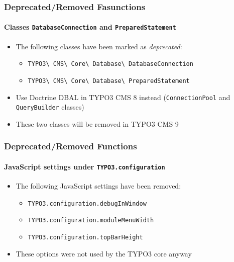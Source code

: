 \begin{frame}[fragile]
	\frametitle{Deprecated/Removed Fasunctions}
	\framesubtitle{Classes \texttt{DatabaseConnection} and \texttt{PreparedStatement}}

	\begin{itemize}
		\item The following classes have been marked as \textit{deprecated}:
			\begin{itemize}
				\item \texttt{TYPO3\textbackslash
						CMS\textbackslash
						Core\textbackslash
						Database\textbackslash
						DatabaseConnection}
				\item \texttt{TYPO3\textbackslash
						CMS\textbackslash
						Core\textbackslash
						Database\textbackslash
						PreparedStatement}
			\end{itemize}
		\item Use Doctrine DBAL in TYPO3 CMS 8 instead\newline
				(\texttt{ConnectionPool} and \texttt{QueryBuilder} classes)
		\item These two classes will be removed in TYPO3 CMS 9
	\end{itemize}

\end{frame}


\begin{frame}[fragile]
	\frametitle{Deprecated/Removed Functions}
	\framesubtitle{JavaScript settings under \texttt{TYPO3.configuration}}

	\begin{itemize}
		\item The following JavaScript settings have been removed:

		\begin{itemize}
			\item \texttt{TYPO3.configuration.debugInWindow}
			\item \texttt{TYPO3.configuration.moduleMenuWidth}
			\item \texttt{TYPO3.configuration.topBarHeight}
		\end{itemize}

		\item These options were not used by the TYPO3 core anyway

	\end{itemize}

\end{frame}


